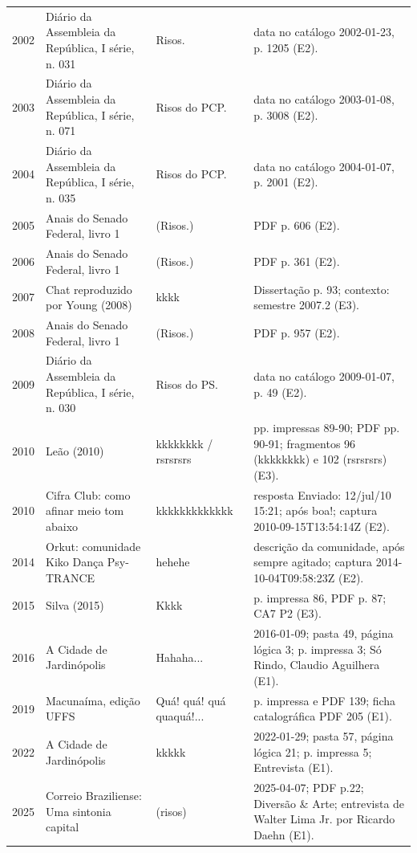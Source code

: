 \begin{longtable}{p{}p{}p{}p{}}
2002 & Diário da Assembleia da República, I série, n. 031 \cite{anual2002} & Risos. & data no catálogo 2002-01-23, p. 1205 (E2). \\
2003 & Diário da Assembleia da República, I série, n. 071 \cite{anual2003} & Risos do PCP. & data no catálogo 2003-01-08, p. 3008 (E2). \\
2004 & Diário da Assembleia da República, I série, n. 035 \cite{anual2004} & Risos do PCP. & data no catálogo 2004-01-07, p. 2001 (E2). \\
2005 & Anais do Senado Federal, livro 1 \cite{anual2005} & (Risos.) & PDF p. 606 (E2). \\
2006 & Anais do Senado Federal, livro 1 \cite{anual2006} & (Risos.) & PDF p. 361 (E2). \\
2007 & Chat reproduzido por Young (2008) \cite{young2008} & kkkk & Dissertação p. 93; contexto: semestre 2007.2 (E3). \\
2008 & Anais do Senado Federal, livro 1 \cite{anual2008} & (Risos.) & PDF p. 957 (E2). \\
2009 & Diário da Assembleia da República, I série, n. 030 \cite{anual2009} & Risos do PS. & data no catálogo 2009-01-07, p. 49 (E2). \\
2010 & Leão (2010) \cite{leao2010} & kkkkkkkk / rsrsrsrs & pp. impressas 89-90; PDF pp. 90-91; fragmentos 96 (kkkkkkkk) e 102 (rsrsrsrs) (E3). \\
2010 & Cifra Club: como afinar meio tom abaixo \cite{r4forumcifraclub} & kkkkkkkkkkkkk & resposta Enviado: 12/jul/10 15:21; após boa!; captura 2010-09-15T13:54:14Z (E2). \\
2014 & Orkut: comunidade Kiko Dança Psy-TRANCE \cite{r4orkutcomunidades} & hehehe & descrição da comunidade, após sempre agitado; captura 2014-10-04T09:58:23Z (E2). \\
2015 & Silva (2015) \cite{silva2015} & Kkkk & p. impressa 86, PDF p. 87; CA7 P2 (E3). \\
2016 & A Cidade de Jardinópolis \cite{r3doc18} & Hahaha... & 2016-01-09; pasta 49, página lógica 3; p. impressa 3; Só Rindo, Claudio Aguilhera (E1). \\
2019 & Macunaíma, edição UFFS \cite{andrade2019} & Quá! quá! quá quaquá!... & p. impressa e PDF 139; ficha catalográfica PDF 205 (E1). \\
2022 & A Cidade de Jardinópolis \cite{r3doc19} & kkkkk & 2022-01-29; pasta 57, página lógica 21; p. impressa 5; Entrevista (E1). \\
2025 & Correio Braziliense: Uma sintonia capital \cite{r3doc21} & (risos) & 2025-04-07; PDF p.22; Diversão \& Arte; entrevista de Walter Lima Jr. por Ricardo Daehn (E1). \\
\bottomrule\end{longtable}\normalsize